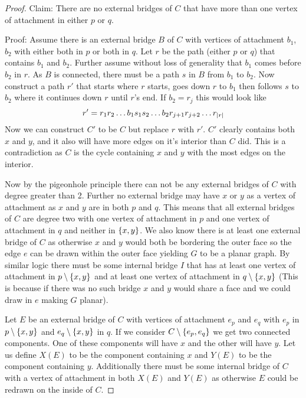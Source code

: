 \documentclass{article}
\begin{document}
\begin{proof}
	Claim: There are no external bridges of $C$ that have more than one vertex of attachment in either $p$ or $q$.
	
	Proof: Assume there is an external bridge $B$ of $C$ with vertices of attachment $b_1$, $b_2$ with either both in $p$ or both in $q$. Let $r$ be the path (either $p$ or $q$) that contains $b_1$ and $b_2$. Further assume without loss of generality that $b_1$ comes before $b_2$ in $r$. As $B$ is connected, there must be a path $s$ in $B$ from $b_1$ to $b_2$. Now construct a path $r'$ that starts where $r$ starts, goes down $r$ to $b_1$ then follows $s$ to $b_2$ where it continues down $r$ until $r$'s end. If $b_2 = r_j$ this would look like
	$$
	r' = r_1r_2\ldots b_1s_1s_2\ldots b_2r_{j+1}r_{j+2}\ldots r_{\left| {r} \right|}
	$$
	Now we can construct $C'$ to be $C$ but replace $r$ with $r'$. $C'$ clearly contains both $x$ and $y$, and it also will have more edges on it's interior than $C$ did. This is a contradiction as $C$ is the cycle containing $x$ and $y$ with the most edges on the interior.
	
	Now by the pigeonhole principle there can not be any external bridges of $C$ with degree greater than 2. Further no external bridge may have $x$ or $y$ as a vertex of attachment as $x$ and $y$ are in both $p$ and $q$. This means that all external bridges of $C$ are degree two with one vertex of attachment in $p$ and one vertex of attachment in $q$ and neither in $\left\{ {x,y} \right\}$. We also know there is at least one external bridge of $C$ as otherwise $x$ and $y$ would both be bordering the outer face so the edge $e$ can be drawn within the outer face yielding $G$ to be a planar graph. By similar logic there must be some internal bridge $I$ that has at least one vertex of attachment in $p\setminus\left\{ {x,y} \right\}$ and at least one vertex of attachment in $q\setminus\left\{ {x,y} \right\}$ (This is because if there was no such bridge $x$ and $y$ would share a face and we could draw in $e$ making $G$ planar).
	
	Let $E$ be an external bridge of $C$ with vertices of attachment $e_p$ and $e_q$ with $e_p$ in $p\setminus\left\{ {x,y} \right\}$ and $e_q\setminus\left\{ {x,y} \right\}$ in $q$. If we consider $C\setminus\left\{ {e_p,e_q} \right\}$ we get two connected components. One of these components will have $x$ and the other will have $y$. Let us define $X(E)$ to be the component containing $x$ and $Y(E)$ to be the component containing $y$. Additionally there must be some internal bridge of $C$ with a vertex of attachment in both $X(E)$ and $Y(E)$ as otherwise $E$ could be redrawn on the inside of $C$.
	

\end{proof}
\end{document}
